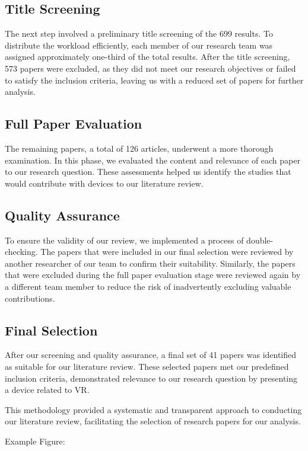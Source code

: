 \subsection{Title Screening}
The next step involved a preliminary title screening of the 699 results. To distribute the workload efficiently, each member of our research team was assigned approximately one-third of the total results. After the title screening, 573 papers were excluded, as they did not meet our research objectives or failed to satisfy the inclusion criteria, leaving us with a reduced set of papers for further analysis.


\subsection{Full Paper Evaluation}
The remaining papers, a total of 126 articles, underwent a  more thorough examination. In this phase, we evaluated the content and relevance of each paper to our research question. These assessments helped us identify the studies that would contribute with devices to our literature review.

\subsection{Quality Assurance}
To ensure the validity of our review, we implemented a process of double-checking. The papers that were included in our final selection were reviewed by another researcher of our team to confirm their suitability. Similarly, the papers that were excluded during the full paper evaluation stage were reviewed again by a different team member to reduce the risk of inadvertently excluding valuable contributions.

\subsection{Final Selection}
After our screening and quality assurance, a final set of 41 papers was identified as suitable for our literature review. These selected papers met our predefined inclusion criteria, demonstrated relevance to our research question by presenting a device related to VR.

This methodology provided a systematic and transparent approach to conducting our literature review, facilitating the selection of research papers for our analysis.








Example Figure:


